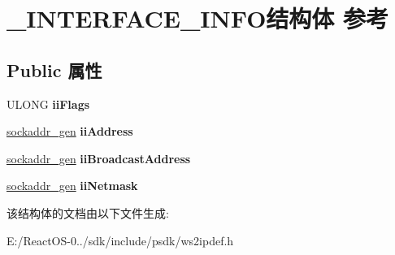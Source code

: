 \hypertarget{struct___i_n_t_e_r_f_a_c_e___i_n_f_o}{}\section{\+\_\+\+I\+N\+T\+E\+R\+F\+A\+C\+E\+\_\+\+I\+N\+F\+O结构体 参考}
\label{struct___i_n_t_e_r_f_a_c_e___i_n_f_o}
\subsection*{Public 属性}
\begin{DoxyCompactItemize}
\item 
\mbox{\label{struct___i_n_t_e_r_f_a_c_e___i_n_f_o_a081a773368acbb47deb2a8dd359999eb}} 
U\+L\+O\+NG {\bfseries ii\+Flags}
\item 
\mbox{\label{struct___i_n_t_e_r_f_a_c_e___i_n_f_o_a628d5247b71b12cc8b91b9e9556147a4}} 
\hyperlink{unionsockaddr__gen}{sockaddr\+\_\+gen} {\bfseries ii\+Address}
\item 
\mbox{\label{struct___i_n_t_e_r_f_a_c_e___i_n_f_o_a483bd035dc3aec9a3a8d3d08336b7383}} 
\hyperlink{unionsockaddr__gen}{sockaddr\+\_\+gen} {\bfseries ii\+Broadcast\+Address}
\item 
\mbox{\label{struct___i_n_t_e_r_f_a_c_e___i_n_f_o_a557bb3164df53c07c1fbc479ee2d72bd}} 
\hyperlink{unionsockaddr__gen}{sockaddr\+\_\+gen} {\bfseries ii\+Netmask}
\end{DoxyCompactItemize}


该结构体的文档由以下文件生成\+:\begin{DoxyCompactItemize}
\item 
E\+:/\+React\+O\+S-\/0../sdk/include/psdk/ws2ipdef.\+h\end{DoxyCompactItemize}
